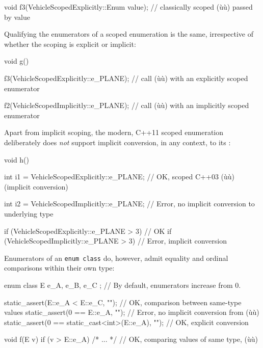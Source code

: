 \begin{emcppslisting}[emcppsbatch=e3,]
void f3(VehicleScopedExplicitly::Enum value);
    // classically scoped (ù{}ù) passed by value
\end{emcppslisting}

\noindent Qualifying the enumerators of a scoped enumeration is the same,
irrespective of whether the scoping is explicit or implicit:

\begin{emcppslisting}[emcppsbatch=e3]
void g()
{
    f3(VehicleScopedExplicitly::e_PLANE);
        // call (ù{}ù) with an explicitly scoped enumerator

    f2(VehicleScopedImplicitly::e_PLANE);
        // call (ù{}ù) with an implicitly scoped enumerator
}
\end{emcppslisting}

\noindent Apart from implicit scoping, the modern, C++11
scoped enumeration deliberately does \emph{not} support
implicit conversion, in any context, to its :

\begin{emcppslisting}[emcppsbatch=e3]
void h()
{
    int i1 = VehicleScopedExplicitly::e_PLANE;
       // OK, scoped C++03 (ù{}ù) (implicit conversion)
 
    int i2 = VehicleScopedImplicitly::e_PLANE;
        // Error, no implicit conversion to underlying type

    if (VehicleScopedExplicitly::e_PLANE > 3) {} // OK
    if (VehicleScopedImplicitly::e_PLANE > 3) {} // Error, implicit conversion
}
\end{emcppslisting}

\noindent Enumerators of an \lstinline!enum!~\lstinline!class! do, however, admit
equality and ordinal comparisons within their own type:

\begin{emcppslisting}[emcppsbatch=e4]
enum class E { e_A, e_B, e_C };  // By default, enumerators increase from 0.

static_assert(E::e_A < E::e_C, "");  // OK, comparison between same-type values
static_assert(0 == E::e_A, "");      // Error, no implicit conversion from (ù{}ù)
static_assert(0 == static_cast<int>(E::e_A), "");  // OK, explicit conversion

void f(E v)
{
    if (v > E::e_A) { /* ... */ }  // OK, comparing values of same type, (ù{}ù)
}
\end{emcppslisting}

